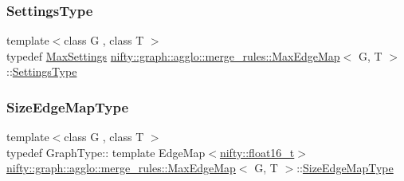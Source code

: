 \mbox{\label{classnifty_1_1graph_1_1agglo_1_1merge__rules_1_1MaxEdgeMap_a7123769ad8199741d682d9de6be59ca3}} 
\subsubsection{\texorpdfstring{Settings\+Type}{SettingsType}}
{\footnotesize\ttfamily template$<$class G , class T $>$ \\
typedef \hyperlink{structnifty_1_1graph_1_1agglo_1_1merge__rules_1_1MaxSettings}{Max\+Settings} \hyperlink{classnifty_1_1graph_1_1agglo_1_1merge__rules_1_1MaxEdgeMap}{nifty\+::graph\+::agglo\+::merge\+\_\+rules\+::\+Max\+Edge\+Map}$<$ G, T $>$\+::\hyperlink{classnifty_1_1graph_1_1agglo_1_1merge__rules_1_1MaxEdgeMap_a7123769ad8199741d682d9de6be59ca3}{Settings\+Type}}

\mbox{\label{classnifty_1_1graph_1_1agglo_1_1merge__rules_1_1MaxEdgeMap_aed9c04ef6558fb988fb2bb2a49a3d4a3}} 
\subsubsection{\texorpdfstring{Size\+Edge\+Map\+Type}{SizeEdgeMapType}}
{\footnotesize\ttfamily template$<$class G , class T $>$ \\
typedef Graph\+Type\+:: template Edge\+Map$<$\hyperlink{namespacenifty_a20031b62bd5c16b943905d43a8ed361a}{nifty\+::float16\+\_\+t}$>$ \hyperlink{classnifty_1_1graph_1_1agglo_1_1merge__rules_1_1MaxEdgeMap}{nifty\+::graph\+::agglo\+::merge\+\_\+rules\+::\+Max\+Edge\+Map}$<$ G, T $>$\+::\hyperlink{classnifty_1_1graph_1_1agglo_1_1merge__rules_1_1MaxEdgeMap_aed9c04ef6558fb988fb2bb2a49a3d4a3}{Size\+Edge\+Map\+Type}}



